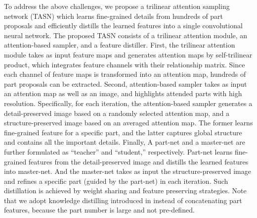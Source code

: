 \documentclass[10pt,twocolumn,letterpaper]{article}
\begin{document}
To address the above challenges, we propose a trilinear attention sampling network (TASN) which learns fine-grained details from hundreds of part proposals and efficiently distills the learned features into a single convolutional neural network. The proposed TASN consists of a trilinear attention module, an attention-based sampler, and a feature distiller.
First, the trilinear attention module takes as input feature maps and generates attention maps by self-trilinear product, which integrates feature channels with their relationship matrix. Since each channel of feature maps is transformed into an attention map, hundreds of part proposals can be extracted. Second, attention-based sampler takes as input an attention map as well as an image, and highlights attended parts with high resolution. Specifically, for each iteration, the attention-based sampler generates a detail-preserved image based on a randomly selected attention map, and a structure-preserved image based on an averaged attention map. The former learns fine-grained feature for a specific part, and the latter captures global structure and contains all the important details. Finally, A part-net and a master-net are further formulated as ``teacher'' and ``student,'' respectively. Part-net learns fine-grained features from the detail-preserved image and distills the learned features into master-net. And the master-net takes as input the structure-preserved image and refines a specific part (guided by the part-net) in each iteration. Such distillation is achieved by weight sharing and feature preserving strategies. Note that we adopt knowledge distilling introduced in \cite{hinton2014distilling} instead of concatenating part features, because the part number is large and not pre-defined.
\end{document}
